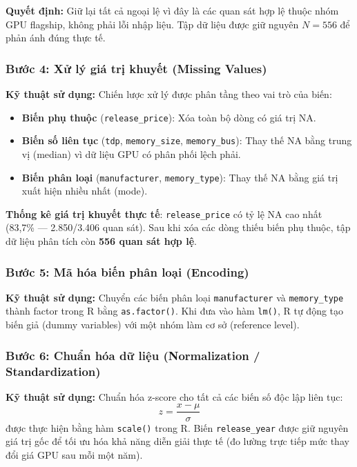 \documentclass[a4paper]{article}
\begin{document}
\textbf{Quyết định:} Giữ lại tất cả ngoại lệ vì đây là các quan sát hợp lệ thuộc nhóm GPU flagship, không phải lỗi nhập liệu. Tập dữ liệu được giữ nguyên $N = 556$ để phản ánh đúng thực tế.

\subsubsection{Bước 4: Xử lý giá trị khuyết (Missing Values)}

\textbf{Kỹ thuật sử dụng:} Chiến lược xử lý được phân tầng theo vai trò của biến:
\begin{itemize}
    \item \textbf{Biến phụ thuộc} (\texttt{release\_price}): Xóa toàn bộ dòng có giá trị NA.
    \item \textbf{Biến số liên tục} (\texttt{tdp}, \texttt{memory\_size}, \texttt{memory\_bus}): Thay thế NA bằng trung vị (median) vì dữ liệu GPU có phân phối lệch phải.
    \item \textbf{Biến phân loại} (\texttt{manufacturer}, \texttt{memory\_type}): Thay thế NA bằng giá trị xuất hiện nhiều nhất (mode).
\end{itemize}

\textbf{Thống kê giá trị khuyết thực tế}: \texttt{release\_price} có tỷ lệ NA cao nhất (83,7\% --- 2.850/3.406 quan sát). Sau khi xóa các dòng thiếu biến phụ thuộc, tập dữ liệu phân tích còn \textbf{556 quan sát hợp lệ}.

\subsubsection{Bước 5: Mã hóa biến phân loại (Encoding)}

\textbf{Kỹ thuật sử dụng:} Chuyển các biến phân loại \texttt{manufacturer} và \texttt{memory\_type} thành factor trong R bằng \texttt{as.factor()}. Khi đưa vào hàm \texttt{lm()}, R tự động tạo biến giả (dummy variables) với một nhóm làm cơ sở (reference level).

\subsubsection{Bước 6: Chuẩn hóa dữ liệu (Normalization / Standardization)}

\textbf{Kỹ thuật sử dụng:} Chuẩn hóa z-score cho tất cả các biến số độc lập liên tục:
\[
z = \frac{x - \mu}{\sigma}
\]
được thực hiện bằng hàm \texttt{scale()} trong R. Biến \texttt{release\_year} được giữ nguyên giá trị gốc để tối ưu hóa khả năng diễn giải thực tế (đo lường trực tiếp mức thay đổi giá GPU sau mỗi một năm).
\end{document}

